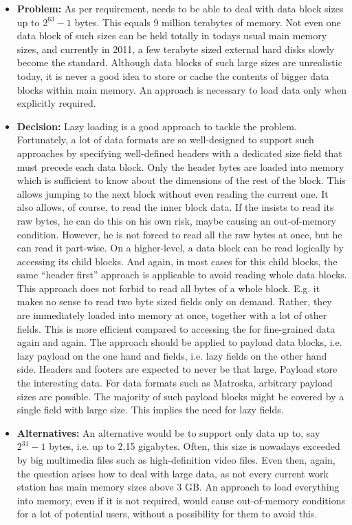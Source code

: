 \begin{itemize}
	\item \textbf{Problem:} As per requirement, \LibName{} needs to be able to deal with data block sizes up to $2^{63}-1$ bytes. This equals 9 million terabytes of memory. Not even one data block of such sizes can be held totally in todays usual main memory sizes, and currently in 2011, a few terabyte sized external hard disks slowly become the standard. Although data blocks of such large sizes are unrealistic today, it is never a good idea to store or cache the contents of bigger data blocks within main memory. An approach is necessary to load data only when explicitly required.
	\item \textbf{Decision:} Lazy loading is a good approach to tackle the problem. Fortunately, a lot of data formats are so well-designed to support such approaches by specifying well-defined headers with a dedicated size field that must precede each data block. Only the header bytes are loaded into memory which is sufficient to know about the dimensions of the rest of the block. This allows jumping to the next block without even reading the current one. It also allows, of course, to read the inner block data. If the \ACTORuser{} insists to read its raw bytes, he can do this on his own risk, maybe causing an out-of-memory condition. However, he is not forced to read all the raw bytes at once, but he can read it part-wise. On a higher-level, a data block can be read logically by accessing its child blocks. And again, in most cases for this child blocks, the same ``header first'' approach is applicable to avoid reading whole data blocks. This approach does not forbid to read all bytes of a whole block. E.g. it makes no sense to read two byte sized fields only on demand. Rather, they are immediately loaded into memory at once, together with a lot of other fields. This is more efficient compared to accessing the \TERMmedium{} for fine-grained data again and again. The approach should be applied to payload data blocks, i.e. lazy payload on the one hand and fields, i.e. lazy fields on the other hand side. Headers and footers are expected to never be that large. Payload store the interesting data. For data formats such as Matroska, arbitrary payload sizes are possible. The majority of such payload blocks might be covered by a single field with large size. This implies the need for lazy fields.
	\item \textbf{Alternatives:} An alternative would be to support only data up to, say $2^{31}-1$ bytes, i.e. up to 2,15 gigabytes. Often, this size is nowadays exceeded by big multimedia files such as high-definition video files. Even then, again, the question arises how to deal with large data, as not every current work station has main memory sizes above 3 GB. An approach to load everything into memory, even if it is not required, would cause out-of-memory conditions for a lot of \LibName{} potential users, without a possibility for them to avoid this.

\end{itemize}
